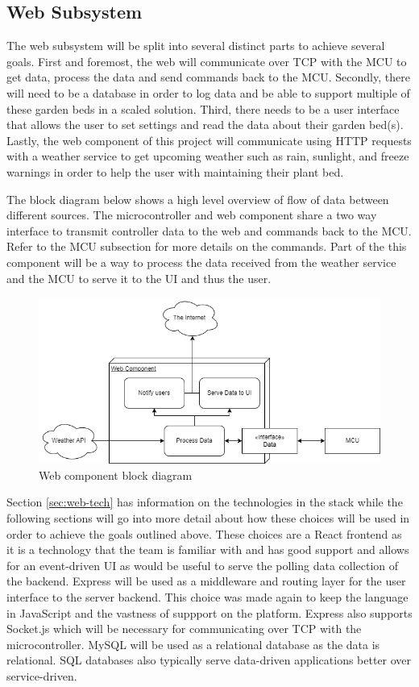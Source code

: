 \subsection{Web Subsystem}
\label{sec:web_subsystem}
The web subsystem will be split into several distinct parts to achieve several goals. First and foremost, the web will communicate over TCP with the MCU to get data, process the data and send commands back to the MCU. Secondly, there will need to be a database in order to log data and be able to support multiple of these garden beds in a scaled solution. Third, there needs to be a user interface that allows the user to set settings and read the data about their garden bed(s). Lastly, the web component of this project will communicate using HTTP requests with a weather service to get upcoming weather such as rain, sunlight, and freeze warnings in order to help the user with maintaining their plant bed.


The block diagram below shows a high level overview of flow of data between different sources. The microcontroller and web component share a two way interface to transmit controller data to the web and commands back to the MCU. Refer to the MCU subsection for more details on the commands. Part of the this component will be a way to process the data received from the weather service and the MCU to serve it to the UI and thus the user. 
\begin{figure}[H]
    \caption{Web component block diagram}
    \centering
    \includegraphics[width=\textwidth]{images/WebBlock.png}
\end{figure}
Section \ref{sec:web-tech} has information on the technologies in the stack while the following sections will go into more detail about how these choices will be used in order to achieve the goals outlined above. These choices are a React frontend as it is a technology that the team is familiar with and has good support and allows for an event-driven UI as would be useful to serve the polling data collection of the backend. Express will be used as a middleware and routing layer for the user interface to the server backend. This choice was made again to keep the language in JavaScript and the vastness of suppport on the platform. Express also supports Socket.js which will be necessary for communicating over TCP with the microcontroller. MySQL will be used as a relational database as the data is relational. SQL databases also typically serve data-driven applications better over service-driven.
